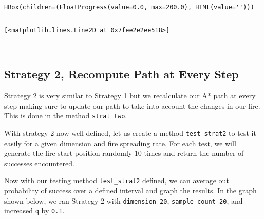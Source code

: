 \documentclass[11pt]{article}
\makeatletter
\newcommand{\boxspacing}{\kern\kvtcb@left@rule\kern\kvtcb@boxsep}
\newcommand{\prompt}[4]{
        {\ttfamily\llap{{\color{#2}[#3]:\hspace{3pt}#4}}\vspace{-\baselineskip}}
    }
\makeatother
\begin{document}
    
    \begin{Verbatim}[commandchars=\\\{\}]
HBox(children=(FloatProgress(value=0.0, max=200.0), HTML(value='')))
    \end{Verbatim}

    
    \begin{Verbatim}[commandchars=\\\{\}]

    \end{Verbatim}

            \begin{tcolorbox}[breakable, size=fbox, boxrule=.5pt, pad at break*=1mm, opacityfill=0]
\prompt{Out}{outcolor}{ }{\boxspacing}
\begin{Verbatim}[commandchars=\\\{\}]
[<matplotlib.lines.Line2D at 0x7fee2e2ee518>]
\end{Verbatim}
\end{tcolorbox}
        
    \begin{center}
    \end{center}
    { \hspace*{\fill} \\}
    
    \hypertarget{strategy-2-recompute-path-at-every-step}{%
\subsection{Strategy 2, Recompute Path at Every
Step}\label{strategy-2-recompute-path-at-every-step}}

Strategy 2 is very similar to Strategy 1 but we recalculate our A* path
at every step making sure to update our path to take into account the
changes in our fire. This is done in the method \texttt{strat\_two}.

    With strategy 2 now well defined, let us create a method
\texttt{test\_strat2} to test it easily for a given dimension and fire
spreading rate. For each test, we will generate the fire start position
randomly 10 times and return the number of successes encountered.

    Now with our testing method \texttt{test\_strat2} defined, we can
average out probability of success over a defined interval and graph the
results. In the graph shown below, we ran Strategy 2 with
\texttt{dimension\ 20}, \texttt{sample\ count\ 20}, and increased
\texttt{q} by \texttt{0.1}.
\end{document}
